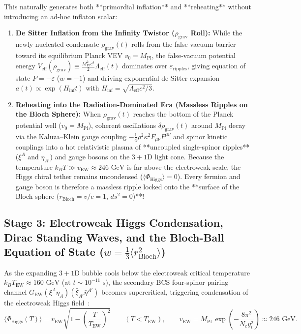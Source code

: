 \documentclass[11pt,a4paper]{article}
\begin{document}
This naturally generates both **primordial inflation** and **reheating** without introducing an ad-hoc inflaton scalar:
\begin{enumerate}
    \item \textbf{De Sitter Inflation from the Infinity Twistor ($\rho_{\text{grav}}$ Roll):} While the newly nucleated condensate $\rho_{\text{grav}}(t)$ rolls from the false-vacuum barrier toward its equilibrium Planck VEV $v_0 = M_{\text{Pl}}$, the false-vacuum potential energy $V_{\text{eff}}(\rho_{\text{grav}}) \equiv \frac{M_{\text{Pl}}^2 c^4}{2}\Lambda_{\text{eff}}(t)$ dominates over $\varepsilon_{\text{ripples}}$, giving equation of state $P = -\varepsilon$ ($w = -1$) and driving exponential de Sitter expansion $a(t) \propto \exp(H_{\text{inf}} t)$ with $H_{\text{inf}} = \sqrt{\Lambda_{\text{eff}} c^2 / 3}$.
    \item \textbf{Reheating into the Radiation-Dominated Era (Massless Ripples on the Bloch Sphere):} When $\rho_{\text{grav}}(t)$ reaches the bottom of the Planck potential well ($v_0 = M_{\text{Pl}}$), coherent oscillations $\delta\rho_{\text{grav}}(t)$ around $M_{\text{Pl}}$ decay via the Kaluza--Klein gauge coupling $-\frac{1}{4}\rho^2\kappa^2 F_{\mu\nu}F^{\mu\nu}$ and spinor kinetic couplings into a hot relativistic plasma of **uncoupled single-spinor ripples** ($\xi^A$ and $\eta_{A'}$) and gauge bosons on the $3+1\text{D}$ light cone. Because the temperature $k_B T \gg v_{\text{EW}} \approx 246\text{ GeV}$ is far above the electroweak scale, the Higgs chiral tether remains uncondensed ($\langle\Phi_{\text{Higgs}}\rangle = 0$). Every fermion and gauge boson is therefore a massless ripple locked onto the **surface of the Bloch sphere ($r_{\text{Bloch}} = v/c = 1$, $ds^2 = 0$)**!
\end{enumerate}

\subsection{Stage 3: Electroweak Higgs Condensation, Dirac Standing Waves, and the Bloch-Ball Equation of State (\texorpdfstring{$w = \frac{1}{3}\langle r_{\text{Bloch}}^2\rangle$}{w = 1/3 <r\_Bloch\^2>})}
As the expanding $3+1\text{D}$ bubble cools below the electroweak critical temperature $k_B T_{\text{EW}} \approx 160\text{ GeV}$ (at $t \sim 10^{-11}\text{ s}$), the secondary BCS four-spinor pairing channel $G_{\text{EW}}(\xi^A\eta_A)(\bar{\xi}_{A'}\bar{\eta}^{A'})$ becomes supercritical, triggering condensation of the electroweak Higgs field~\cite{Higgs1964,NJL1961}:
\begin{equation}
\langle \Phi_{\text{Higgs}}(T) \rangle = v_{\text{EW}} \sqrt{1 - \left(\frac{T}{T_{\text{EW}}}\right)^2} \qquad (T < T_{\text{EW}}), \qquad v_{\text{EW}} = M_{\text{Pl}}\, \exp\!\left(-\frac{8\pi^2}{N_c y_t^2}\right) \approx 246\text{ GeV}.
\end{equation}
\end{document}
